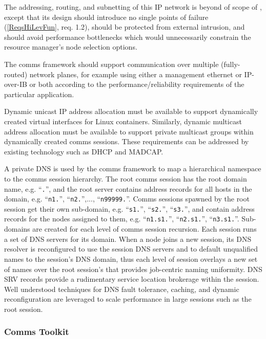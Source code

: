 The addressing, routing, and subnetting of this IP network is beyond of
scope of \ngrm, except that its design should introduce no single
points of failure (\ref{ReqsHiLevFun}, req. 1.2), should be protected
from external intrusion, and should avoid performance bottlenecks which
would unnecessarily constrain the resource manager's node selection options.

The comms framework should support communication over multiple
(fully-routed) network planes, for example using either a management
ethernet or IP-over-IB or both according to the performance/reliability
requirements of the particular application.

Dynamic unicast IP address allocation must be available to support
dynamically created virtual interfaces for Linux containers.  Similarly,
dynamic multicast address allocation must be available to support
private multicast groups within dynamically created comms sessions.
These requirements can be addressed by existing technology such as
DHCP\cite{rfc2131} and MADCAP\cite{rfc2730}.

A private DNS\cite{rfc1034} is used by the comms framework to
map a hierarchical namespace to the comms session hierarchy.
The root comms session has the root domain name, e.g. ``{\tt \ngrm.}'',
and the root server contains address records for all hosts in the domain, e.g.
``{\tt n1.\ngrm}'', ``{\tt n2.\ngrm}'',..., ``{\tt n99999.\ngrm}''.
Comms sessions spawned by the root session get their own sub-domain, e.g.
``{\tt s1.\ngrm}'', ``{\tt s2.\ngrm}'', ``{\tt s3.\ngrm}'',
and contain address records for the nodes assigned to them, e.g.
``{\tt n1.s1.\ngrm}'', ``{\tt n2.s1.\ngrm}'', ``{\tt n3.s1.\ngrm}''.
Sub-domains are created for each level of comms session recursion.
Each session runs a set of DNS servers for its domain.
When a node joins a new session, its DNS resolver is reconfigured to use
the session DNS servers and to default unqualified names to the session's
DNS domain, thus each level of session overlays a new set of names over
the root session's that provides job-centric naming uniformity.
DNS SRV records\cite{rfc2782} provide a rudimentary service location
brokerage within the session.
Well understood techniques for DNS fault tolerance,
caching, and dynamic reconfiguration are leveraged to scale performance
in large sessions such as the root session.


\subsubsection{Comms Toolkit}

